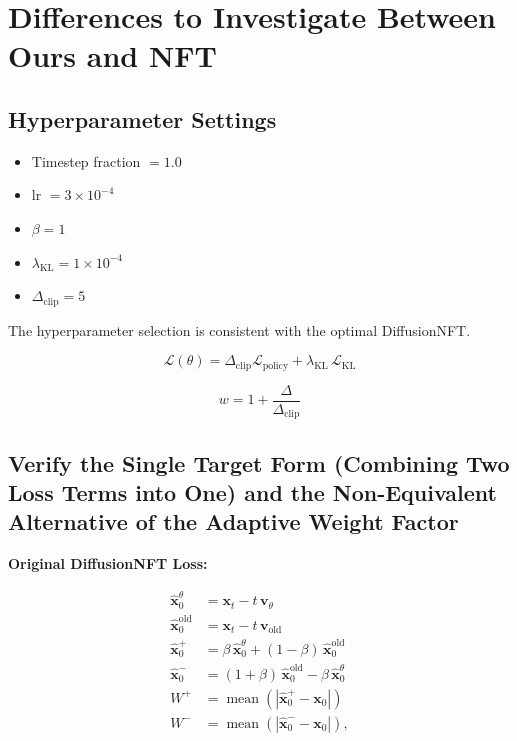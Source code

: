 \documentclass{article} %
\begin{document}
\section{Differences to Investigate Between Ours and NFT}

\subsection*{Hyperparameter Settings}
\begin{itemize}
    \item Timestep fraction $= 1.0$
    \item lr $= 3\times10^{-4}$
    \item $\beta = 1$
    \item $\lambda_{\mathrm{KL}} = 1\times10^{-4}$
    \item $\Delta_{\mathrm{clip}} = 5$
\end{itemize}
The hyperparameter selection is consistent with the optimal DiffusionNFT.

\begin{equation}
\mathcal{L}(\theta) = \Delta_{\mathrm{clip}} \mathcal{L}_{\mathrm{policy}} + \lambda_{\mathrm{KL}}\,\mathcal{L}_{\mathrm{KL}}
\end{equation}

\begin{equation}
w=1+\frac{\Delta}{\Delta_{\mathrm{clip}}}
\end{equation}

\subsection{Verify the Single Target Form (Combining Two Loss Terms into One) and the Non-Equivalent Alternative of the Adaptive Weight Factor}

\textbf{Original DiffusionNFT Loss:}

\begin{align}
\hat{\mathbf{x}}_0^\theta &= \mathbf{x}_t - t\,\mathbf{v}_\theta \\
\hat{\mathbf{x}}_0^{\mathrm{old}} &= \mathbf{x}_t - t\,\mathbf{v}_{\mathrm{old}} \\
\hat{\mathbf{x}}_0^+ &= \beta\,\hat{\mathbf{x}}_0^\theta + (1-\beta)\,\hat{\mathbf{x}}_0^{\mathrm{old}} \\
\hat{\mathbf{x}}_0^- &= (1+\beta)\,\hat{\mathbf{x}}_0^{\mathrm{old}} - \beta\,\hat{\mathbf{x}}_0^\theta \\
W^+ &= \operatorname{mean}\!\left(\left|\hat{\mathbf{x}}_0^+ - \mathbf{x}_0\right|\right) \\
W^- &= \operatorname{mean}\!\left(\left|\hat{\mathbf{x}}_0^- - \mathbf{x}_0\right|\right),
\end{align}
\end{document}
